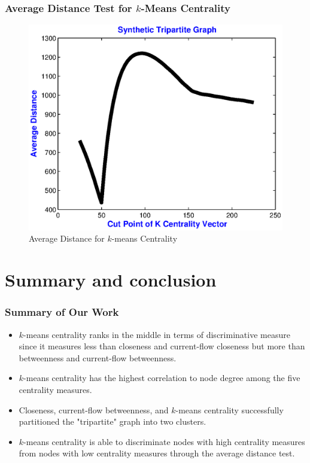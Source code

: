 \documentclass{beamer}
\begin{document}
\begin{frame}
\frametitle{Average Distance Test for $k$-Means Centrality }
\begin{figure}[h]
\begin{center}
\includegraphics[width=0.76\columnwidth]{avgdist_kcent}
\end{center}
\caption{Average Distance for $k$-means Centrality}
\label{fig:Average distance for k centrality}
\end{figure}
\end{frame}








\section{Summary and conclusion}  \label{sec:conclusion}

\begin{frame}
\frametitle{Summary of Our Work}
\begin{itemize}
\item $k$-means centrality ranks in the middle in terms of discriminative measure since it measures less than closeness and current-flow closeness but more than betweenness and current-flow betweenness.
\item $k$-means centrality has the highest correlation to node degree among the five centrality measures.
\item Closeness, current-flow betweenness, and $k$-means centrality successfully partitioned the "tripartite" graph into two clusters.
\item $k$-means centrality is able to discriminate nodes with high centrality measures from nodes with low centrality measures through the average distance test.
\end{itemize}
\end{frame}
\end{document}
